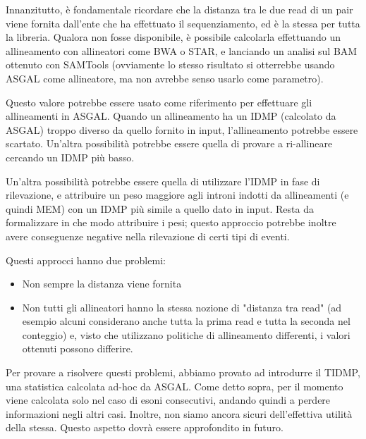Innanzitutto, è fondamentale ricordare che la distanza tra le due read di un pair viene fornita dall'ente che ha effettuato il sequenziamento, ed è la stessa per tutta la libreria. Qualora non fosse disponibile, è possibile calcolarla effettuando un allineamento con allineatori come BWA o STAR, e lanciando un analisi sul BAM ottenuto con SAMTools (ovviamente lo stesso risultato si otterrebbe usando ASGAL come allineatore, ma non avrebbe senso usarlo come parametro).

Questo valore potrebbe essere usato come riferimento per effettuare gli allineamenti in ASGAL. Quando un allineamento ha un IDMP (calcolato da ASGAL) troppo diverso da quello fornito in input, l'allineamento potrebbe essere scartato. Un'altra possibilità potrebbe essere quella di provare a ri-allineare cercando un IDMP più basso. 

Un'altra possibilità potrebbe essere quella di utilizzare l'IDMP in fase di rilevazione, e attribuire un peso maggiore agli introni indotti da allineamenti (e quindi MEM) con un IDMP più simile a quello dato in input. Resta da formalizzare in che modo attribuire i pesi; questo approccio potrebbe inoltre avere conseguenze negative nella rilevazione di certi tipi di eventi.

Questi approcci hanno due problemi:
\begin{itemize}
	\item Non sempre la distanza viene fornita
	\item Non tutti gli allineatori hanno la stessa nozione di "distanza tra read" (ad esempio alcuni considerano anche tutta la prima read e tutta la seconda nel conteggio) e, visto che utilizzano politiche di allineamento differenti, i valori ottenuti possono differire.
\end{itemize}

Per provare a risolvere questi problemi, abbiamo provato ad introdurre il TIDMP, una statistica calcolata ad-hoc da ASGAL. Come detto sopra, per il momento viene calcolata solo nel caso di esoni consecutivi, andando quindi a perdere informazioni negli altri casi. Inoltre, non siamo ancora sicuri dell'effettiva utilità della stessa. Questo aspetto dovrà essere approfondito in futuro.

\newpage